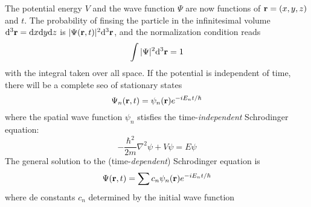 The potential energy $V$ and the wave function $\Psi$ are now functions of $\vb{r}=(x,y,z)$ and $t$. The probability of finsing the particle in the infinitesimal volume $\dd ^3\vb{r}=\dd x\dd y\dd z$ is $|\Psi(\vb{r},t)|^2\dd^3\vb{r}$,  and the normalization condition reads
\begin{equation}\label{4.6}
	\int |\Psi|^2\dd ^3\vb{r}=1
\end{equation}
with the integral taken over all space. If the potential is independent of time, there will be a complete seo of stationary states
\begin{equation}\label{4.7}
	\Psi_n(\vb{r},t)=\psi_n(\vb{r})e^{-iE_nt/\hbar}
\end{equation}
where the spatial wave function $\psi_n$ stisfies the time-\textit{independent} Schrodinger equation:
\begin{equation}\label{4.8}
	\boxed{-\frac{\hbar^2}{2m}\nabla^2\psi+V\psi=E\psi}
\end{equation}
The general solution to the (time-\textit{dependent}) Schrodinger equation is
\begin{equation}\label{4.9}
	\Psi(\vb{r},t)=\sum c_n\psi_n(\vb{r})e^{-iE_nt/\hbar}
\end{equation}
where de constants $c_n$ determined by the initial wave function


 


 

 

 






























